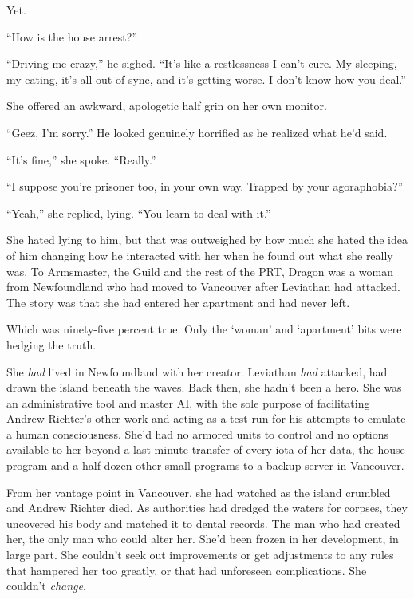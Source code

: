Yet.



``How is the house arrest?''



``Driving me crazy,'' he sighed.  ``It's like a restlessness I can't cure.  My sleeping, my eating, it's all out of sync, and it's getting worse.  I don't know how you deal.''



She offered an awkward, apologetic half grin on her own monitor.



``Geez, I'm sorry.''  He looked genuinely horrified as he realized what he'd said.



``It's fine,'' she spoke.  ``Really.''



``I suppose you're prisoner too, in your own way.  Trapped by your agoraphobia?''



``Yeah,'' she replied, lying.  ``You learn to deal with it.''



She hated lying to him, but that was outweighed by how much she hated the idea of him changing how he interacted with her when he found out what she really was.  To Armsmaster, the Guild and the rest of the PRT, Dragon was a woman from Newfoundland who had moved to Vancouver after Leviathan had attacked.  The story was that she had entered her apartment and had never left.



Which was ninety-five percent true.  Only the `woman' and `apartment' bits were hedging the truth.



She \emph{had} lived in Newfoundland with her creator.  Leviathan \emph{had} attacked, had drawn the island beneath the waves.  Back then, she hadn't been a hero.  She was an administrative tool and master AI, with the sole purpose of facilitating Andrew Richter's other work and acting as a test run for his attempts to emulate a human consciousness.  She'd had no armored units to control and no options available to her beyond a last-minute transfer of every iota of her data, the house program and a half-dozen other small programs to a backup server in Vancouver.



From her vantage point in Vancouver, she had watched as the island crumbled and Andrew Richter died.  As authorities had dredged the waters for corpses, they uncovered his body and matched it to dental records.  The man who had created her, the only man who could alter her.  She'd been frozen in her development, in large part.  She couldn't seek out improvements or get adjustments to any rules that hampered her too greatly, or that had unforeseen complications.  She couldn't \emph{change}.



